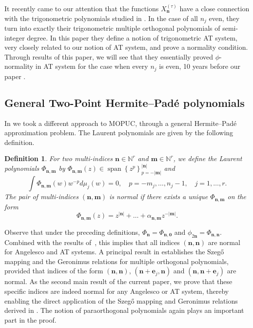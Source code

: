 \documentclass[reqno,centertags,11pt,draft]{amsart}
\newtheorem{defn}[thm]{Definition}
\newcommand{\N}{\mathbb{N}}
\newcommand{\abs}[1]{\left|#1\right|}
\newcommand{\set}[1]{\left\{#1\right\}}
\begin{document}
It recently came to our attention that the functions $X_{\bm{n}}^{(\tau)}$ have a close connection with the trigonometric polynomials studied in \cite{Mil,TrigMop2}. In the case of all $n_j$ even, they turn into exactly their trigonometric multiple orthogonal polynomials of semi-integer degree. In this paper they define a notion of trigonometric AT system, very closely related to our notion of AT system, and prove a normality condition. Through results of this paper, we will see that they essentially proved $\phi$-normality in AT system for the case when every $n_j$ is even, 10 years before our paper \cite{KVMLOPUC}. 

\subsection{General Two-Point Hermite--Pad\'e polynomials}

In \cite{KVHP} we took a different approach to MOPUC, through a general Hermite--Pad\'e approximation problem. The Laurent polynomials are given by the following definition.
\begin{defn}\label{def:hp polynomials}
For two multi-indices $\bm{n} \in \N^r$ and $\bm{m} \in \N^r$, we define the Laurent polynomials $\Phi_{\bm{n},\bm{m}}$ by  $\Phi_{\bm{n},\bm{m}}(z) \in \operatorname{span}\set{z^p}_{p = -\abs{\bm{m}}}^{\abs{\bm{n}}}$ and
    \begin{equation}
\label{eq:generalized hermite pade orthogonality intro}
    \int \Phi_{\bm{n},\bm{m}}(w)w^{-p}d\mu_j(w) = 0, \quad p = -m_j,\dots,n_j-1, \quad j = 1,\dots,r.
\end{equation}
The pair of multi-indices $(\bm{n},\bm{m})$ is normal if there exists a unique $\Phi_{\bm{n},\bm{m}}$ on the form
\begin{equation}\label{eq:moprlIIspan}
    \Phi_{\bm{n},\bm{m}}(z) = z^{\abs{\bm{n}}} + \ldots + \alpha_{\bm{n},\bm{m}}z^{-\abs{\bm{m}}}.
    \end{equation} 
\end{defn}
Observe that under the preceding definitions, $\Phi_{\bm{n}} = \Phi_{\bm{n},\bm{0}}$ and $\phi_{2\bm{n}} = \Phi_{\bm{n},\bm{n}}$. 
Combined with the results of~\cite{KVMLOPUC}, this implies that all indices $(\bm{n},\bm{n})$ are normal for Angelesco and AT systems. A principal result in \cite{KVHP} establishes the Szeg\H{o} mapping and the Geronimus relations for multiple orthogonal polynomials, provided that indices of the form $(\bm{n},\bm{n})$, $(\bm{n}+\bm{e}_j,\bm{n})$ and $(\bm{n},\bm{n}+\bm{e}_j)$ are normal. As the second main result of the current paper, we prove that these specific indices are indeed normal for any Angelesco or AT system, thereby enabling the direct application of the Szeg\H{o} mapping and Geronimus relations derived in \cite{KVHP}.
The notion of paraorthogonal polynomials again plays an important part in the proof. 
\end{document}
